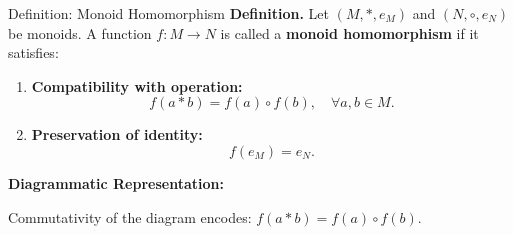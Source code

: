 
\date{15 October 2025}



\begin{frame}
  \cmctitleframe
\end{frame}

\begin{frame}{Definition: Monoid Homomorphism}
\textbf{Definition.}
Let $(M, *, e_M)$ and $(N, \circ, e_N)$ be monoids.
A function \( f: M \to N \) is called a \textbf{monoid homomorphism} if it satisfies:

\begin{enumerate}
    \item \textbf{Compatibility with operation:}
    \[
        f(a * b) = f(a) \circ f(b), \quad \forall a,b \in M.
    \]
    \item \textbf{Preservation of identity:}
    \[
        f(e_M) = e_N.
    \]
\end{enumerate}

\textbf{Diagrammatic Representation:}
\centering
{}
Commutativity of the diagram encodes: \( f(a*b) = f(a)\circ f(b). \)
\end{frame}

